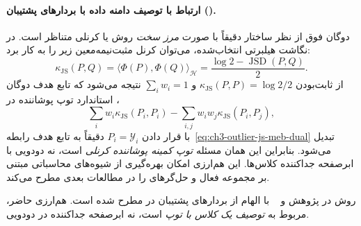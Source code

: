 \paragraph{ارتباط با توصیف دامنه داده با بردارهای پشتیبان ().}
دوگان فوق از نظر ساختار
دقیقاً با صورت \emph{مرز سخت}
روش 
یا  کرنلی متناظر است.
در نگاشت هیلبرتی انتخاب‌شده،
می‌توان کرنل مثبت‌نیمه‌معین
زیر را به کار برد:
\begin{equation}\label{eq:ch3-outlier-js-svdd-kernel}
\kappa_{\mathrm{JS}}(P,Q)
=\langle\Phi(P),\Phi(Q)\rangle_{\mathcal H}
=\frac{\log 2-\operatorname{JSD}(P,Q)}{2}.
\end{equation}
از ثابت‌بودن
$\kappa_{\mathrm{JS}}(P,P)=\log2/2$
و $\sum_iw_i=1$ نتیجه می‌شود که
تابع هدف دوگان استاندارد
توپ پوشاننده در ،
\[
\sum_iw_i\kappa_{\mathrm{JS}}(P_i,P_i)
-\sum_{i,j}w_iw_j\kappa_{\mathrm{JS}}(P_i,P_j),
\]
با قرار دادن $P_i=\mathscr Y_i$
دقیقاً به تابع هدف
رابطه~\eqref{eq:ch3-outlier-js-meb-dual}
تبدیل می‌شود.
بنابراین این همان مسئله
\emph{توپ کمینه پوشاننده کرنلی}
است، نه  دودویی
با ابرصفحه جداکننده کلاس‌ها.
این هم‌ارزی امکان بهره‌گیری
از شیوه‌های محاسباتی
مبتنی بر مجموعه فعال و
حل‌گرهای  را
در مطالعات بعدی مطرح می‌کند.

روش  در پژوهش
 و ~
\cite{TaxDuin2004SVDD}
با الهام از بردارهای پشتیبان
در  مطرح شده است.
هم‌ارزی حاضر، مربوط به
\emph{توصیف یک کلاس با توپ}
است، نه ابرصفحه جداکننده
در  دودویی.

